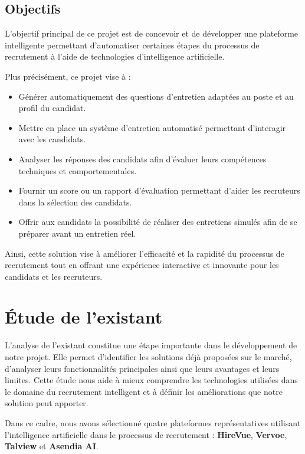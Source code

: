 \subsection{Objectifs}

L’objectif principal de ce projet est de concevoir et de développer une plateforme intelligente permettant d’automatiser certaines étapes du processus de recrutement à l’aide de technologies d’intelligence artificielle.

Plus précisément, ce projet vise à :

\begin{itemize}
    \item Générer automatiquement des questions d’entretien adaptées au poste et au profil du candidat.
    
    \item Mettre en place un système d’entretien automatisé permettant d’interagir avec les candidats.
    
    \item Analyser les réponses des candidats afin d’évaluer leurs compétences techniques et comportementales.
    
    \item Fournir un score ou un rapport d’évaluation permettant d’aider les recruteurs dans la sélection des candidats.
    
    \item Offrir aux candidats la possibilité de réaliser des entretiens simulés afin de se préparer avant un entretien réel.
\end{itemize}

Ainsi, cette solution vise à améliorer l’efficacité et la rapidité du processus de recrutement tout en offrant une expérience interactive et innovante pour les candidats et les recruteurs.
\section{Étude de l’existant}

L’analyse de l’existant constitue une étape importante dans le développement de notre projet. Elle permet d’identifier les solutions déjà proposées sur le marché, d’analyser leurs fonctionnalités principales ainsi que leurs avantages et leurs limites. Cette étude nous aide à mieux comprendre les technologies utilisées dans le domaine du recrutement intelligent et à définir les améliorations que notre solution peut apporter.

Dans ce cadre, nous avons sélectionné quatre plateformes représentatives utilisant l’intelligence artificielle dans le processus de recrutement : \textbf{HireVue}, \textbf{Vervoe}, \textbf{Talview} et \textbf{Asendia AI}.


